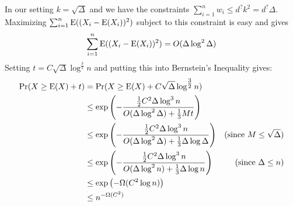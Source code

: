 \documentclass[kpfonts]{patmorin}
\begin{document}
In our setting $k=\sqrt{\Delta}$ and we have the constraints $\sum_{i=1}^n w_i \le d^?k^2=d^?\Delta$.  Maximizing $\sum_{i=1}^n\mathrm{E}((X_i-\mathrm{E}(X_i))^2)$ subject to this constraint is easy and gives
\[
  \sum_{i=1}^n\mathrm{E}((X_i-\mathrm{E}(X_i))^2) = O(\Delta\log^{2}\Delta)
\]
Setting $t=C\sqrt{\Delta}\log^{\tfrac{3}{2}}n$ and putting this into Bernstein's Inequality gives:
\begin{align*}
  \Pr(X\ge \mathrm{E}(X)+t)
  & = \Pr(X\ge \mathrm{E}(X)+C\sqrt{\Delta}\log^{\tfrac{3}{2}}n) \\
  & \le \exp \left(-\frac{\tfrac{1}{2}C^2\Delta\log^3n}{O(\Delta\log^{2}\Delta) + \tfrac{1}{3}Mt}\right) \\
  & \le \exp \left(-\frac{\tfrac{1}{2}C^2\Delta\log^3n}{O(\Delta\log^{2}\Delta) + \tfrac{1}{3}\Delta\log\Delta}\right) & \text{(since $M\le\sqrt{\Delta}$)} \\
  & \le \exp \left(-\frac{\tfrac{1}{2}C^2\Delta\log^3n}{O(\Delta\log^{2}n) + \tfrac{1}{3}\Delta\log n}\right) & \text{(since $\Delta \le n$)} \\
  & \le \exp \left(-\Omega(C^2\log n)\right) \\
  & \le n^{-\Omega(C^2)}
\end{align*}
\end{document}
